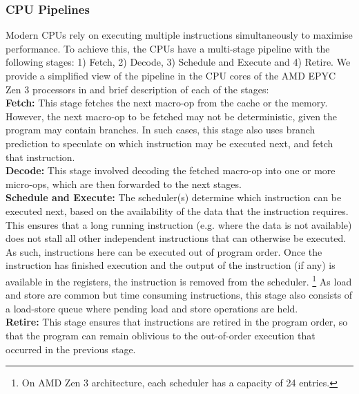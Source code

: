 \subsubsection{CPU Pipelines}
Modern CPUs rely on executing multiple instructions simultaneously to maximise performance.
To achieve this, the CPUs have a multi-stage pipeline with the following stages: 1) Fetch, 2) Decode, 3) Schedule and Execute and 4) Retire.
We provide a simplified view of the pipeline in the CPU cores of the AMD EPYC Zen 3 processors in  and brief description of each of the stages:\\
\textbf{Fetch: } This stage fetches the next macro-op from the cache or the memory. 
However, the next macro-op to be fetched may not be deterministic, given the program may contain branches. 
In such cases, this stage also uses branch prediction to speculate on which instruction may be executed next, and fetch that instruction.\\
\textbf{Decode: } This stage involved decoding the fetched macro-op into one or more micro-ops, which are then forwarded to the next stages.\\
\textbf{Schedule and Execute: } The scheduler(s) determine which instruction can be executed next, based on the availability of the data that the instruction requires. 
This ensures that a long running instruction (e.g. where the data is not available) does not stall all other independent instructions that can otherwise be executed.
As such, instructions here can be executed out of program order. 
Once the instruction has finished execution and the output of the instruction (if any) is available in the registers, the instruction is removed from the scheduler. 
\footnote{On AMD Zen 3 architecture, each scheduler has a capacity of 24 entries.}
As load and store are common but time consuming instructions, this stage also consists of a load-store queue where pending load and store operations are held. \\
\textbf{Retire: } This stage ensures that instructions are retired in the program order, so that the program can remain oblivious to the out-of-order execution that occurred in the previous stage.

